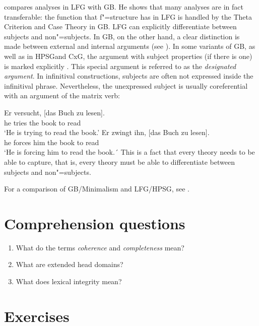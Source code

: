 \citet{Williams84a} compares analyses in LFG with GB. He shows that many analyses are in fact transferable: the function that f"=structure has in LFG is handled by the
Theta Criterion and Case Theory in GB. LFG can explicitly differentiate between subjects and non"=subjects. In GB, on the other hand,
a clear distinction is made between external and internal arguments (see \citealp[Section~1.2]{Williams84a}). In some variants of GB, as well as
in HPSG\indexhpsg and CxG\indexcxg, the argument with subject properties (if there is one) is marked explicitly \citep{Haider86,HM94a,Mueller2003e,MR2001a}. This special argument
is referred to as the \emph{designated argument}. In infinitival constructions, subjects are often not expressed inside the infinitival phrase. Nevertheless, 
the unexpressed subject is usually coreferential with an argument of the matrix verb:

\eal
\ex 
\gll Er versucht, [das Buch zu lesen].\\
	 he tries \spacebr{}the book to read\\
\glt `He is trying to read the book.'
\ex 
\gll Er zwingt ihn, [das Buch zu lesen].\\
	 he forces him \spacebr{}the book to read\\
\glt `He is forcing him to read the book.´
\zl 
This is a fact that every theory needs to be able to capture, that is, every theory must be able to differentiate between subjects and non"=subjects.

For a comparison of GB/Minimalism and LFG/HPSG, see .


\section*{Comprehension questions}

\begin{enumerate}
\item What do the terms \emph{coherence} and \emph{completeness} mean?
\item What are extended head domains?
\item What does lexical integrity mean?
\end{enumerate}

\section*{Exercises}

